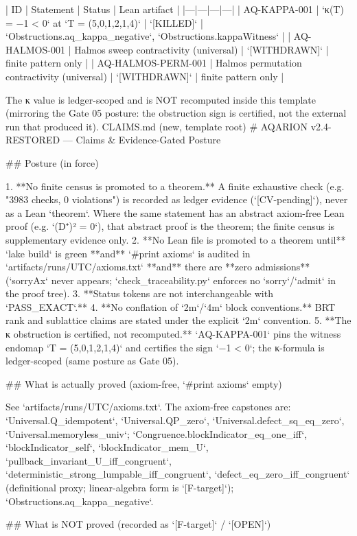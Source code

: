 | ID | Statement | Status | Lean artifact |
|---|---|---|---|
| AQ-KAPPA-001 | `κ(T) = −1 < 0` at `T = (5,0,1,2,1,4)` | `[KILLED]` | `Obstructions.aq_kappa_negative`, `Obstructions.kappaWitness` |
| AQ-HALMOS-001 | Halmos sweep contractivity (universal) | `[WITHDRAWN]` | finite pattern only |
| AQ-HALMOS-PERM-001 | Halmos permutation contractivity (universal) | `[WITHDRAWN]` | finite pattern only |

The κ value is ledger-scoped and is NOT recomputed inside this template
(mirroring the Gate 05 posture: the obstruction sign is certified, not the
external run that produced it).
CLAIMS.md (new, template root)
# AQARION v2.4-RESTORED — Claims & Evidence-Gated Posture

## Posture (in force)

1. **No finite census is promoted to a theorem.** A finite exhaustive check
   (e.g. "3983 checks, 0 violations") is recorded as ledger evidence
   (`[CV-pending]`), never as a Lean `theorem`. Where the same statement has an
   abstract axiom-free Lean proof (e.g. `(D⁺)² = 0`), that abstract proof is the
   theorem; the finite census is supplementary evidence only.
2. **No Lean file is promoted to a theorem until** `lake build` is green **and**
   `#print axioms` is audited in `artifacts/runs/UTC/axioms.txt` **and** there
   are **zero admissions** (`sorryAx` never appears; `check_traceability.py`
   enforces no `sorry`/`admit` in the proof tree).
3. **Status tokens are not interchangeable with `PASS_EXACT`.**
4. **No conflation of `2m`/`4m` block conventions.** BRT rank and sublattice
   claims are stated under the explicit `2m` convention.
5. **The κ obstruction is certified, not recomputed.** `AQ-KAPPA-001` pins the
   witness endomap `T = (5,0,1,2,1,4)` and certifies the sign `−1 < 0`; the
   κ-formula is ledger-scoped (same posture as Gate 05).

## What is actually proved (axiom-free, `#print axioms` empty)

See `artifacts/runs/UTC/axioms.txt`. The axiom-free capstones are:
`Universal.Q_idempotent`, `Universal.QP_zero`, `Universal.defect_sq_eq_zero`,
`Universal.memoryless_univ`; `Congruence.blockIndicator_eq_one_iff`,
`blockIndicator_self`, `blockIndicator_mem_U`,
`pullback_invariant_U_iff_congruent`,
`deterministic_strong_lumpable_iff_congruent`,
`defect_eq_zero_iff_congruent` (definitional proxy; linear-algebra form is
`[F-target]`); `Obstructions.aq_kappa_negative`.

## What is NOT proved (recorded as `[F-target]` / `[OPEN]`)

